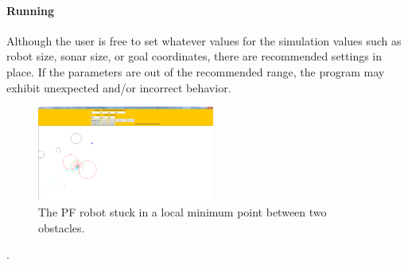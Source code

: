 \documentclass[12pt]{article}
\begin{document}
\paragraph*{Running}
Although the user is free to set whatever values for the simulation values such as robot size, sonar size, or goal coordinates, there are recommended settings in place. If the parameters are out of the recommended range, the program may exhibit unexpected and/or incorrect behavior.


\begin{figure}
\centering
\includegraphics[width=220]{two_obstacles.png}
\caption{The PF robot stuck in a local minimum point between two obstacles.}
\end{figure}.
\end{document}
